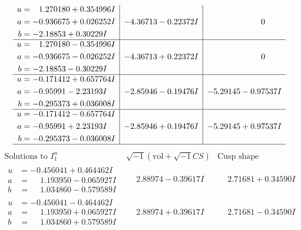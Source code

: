 \documentclass[1p]{elsarticle_modified}
\theoremstyle{definition}
\newcommand{\I}{\sqrt{-1}}
\begin{document}
$$\begin{array}{c|c|c}
\begin{aligned}
u &= \phantom{-}1.270180 + 0.354996 I \\
a &= -0.936675 + 0.026252 I \\
b &= -2.18853 + 0.30229 I\end{aligned}
 & -4.36713 - 0.22372 I & \phantom{-0.000000 } 0 \\ \hline\begin{aligned}
u &= \phantom{-}1.270180 - 0.354996 I \\
a &= -0.936675 - 0.026252 I \\
b &= -2.18853 - 0.30229 I\end{aligned}
 & -4.36713 + 0.22372 I & \phantom{-0.000000 } 0 \\ \hline\begin{aligned}
u &= -0.171412 + 0.657764 I \\
a &= -0.95991 - 2.23193 I \\
b &= -0.295373 + 0.036008 I\end{aligned}
 & -2.85946 - 0.19476 I & -5.29145 - 0.97537 I \\ \hline\begin{aligned}
u &= -0.171412 - 0.657764 I \\
a &= -0.95991 + 2.23193 I \\
b &= -0.295373 - 0.036008 I\end{aligned}
 & -2.85946 + 0.19476 I & -5.29145 + 0.97537 I\\
 \hline 
 \end{array}$$\newpage$$\begin{array}{c|c|c}  
\text{Solutions to }I^u_{1}& \I (\text{vol} + \sqrt{-1}CS) & \text{Cusp shape}\\
 \hline 
\begin{aligned}
u &= -0.456041 + 0.464462 I \\
a &= \phantom{-}1.193950 - 0.065927 I \\
b &= \phantom{-}1.034860 - 0.579589 I\end{aligned}
 & \phantom{-}2.88974 - 0.39617 I & \phantom{-}2.71681 + 0.34590 I \\ \hline\begin{aligned}
u &= -0.456041 - 0.464462 I \\
a &= \phantom{-}1.193950 + 0.065927 I \\
b &= \phantom{-}1.034860 + 0.579589 I\end{aligned}
 & \phantom{-}2.88974 + 0.39617 I & \phantom{-}2.71681 - 0.34590 I \\ \hline\begin{aligned}

\end{aligned}
\end{array}$$
\end{document}

